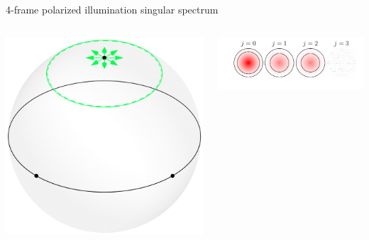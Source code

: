 \documentclass[presentation]{beamer}
\begin{document}
\begin{frame}[label=sec-1]{4-frame polarized illumination singular spectrum}
  \begin{columns}
    \begin{column}{0.25\textwidth}
      \centering
      \includegraphics[width=1.0\columnwidth]{pol_illum/scene.pdf}
    \end{column}
    \begin{column}{0.75\textwidth}
      \centering
      \includegraphics[width=1.0\columnwidth]{pol_illum/svs.pdf}
    \end{column}
  \end{columns}
\end{frame}
\end{document}
